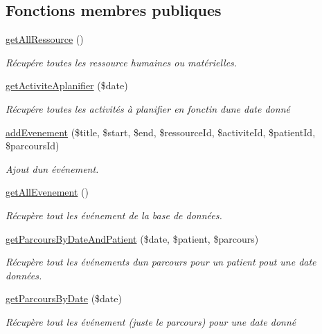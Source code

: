 \subsection*{Fonctions membres publiques}
\begin{DoxyCompactItemize}
\item 
\hyperlink{class_m___planning_a058d0ecc4af6cfeadea6908cede9dcbb}{get\+All\+Ressource} ()
\begin{DoxyCompactList}\small\item\em Récupére toutes les ressource humaines ou matérielles. \end{DoxyCompactList}\item 
\hyperlink{class_m___planning_ac8e09307ac103e0f2b8bbfa828e7f723}{get\+Activite\+Aplanifier} (\$date)
\begin{DoxyCompactList}\small\item\em Récupére toutes les activités à planifier en fonctin d\textquotesingle{}une date donné \end{DoxyCompactList}\item 
\hyperlink{class_m___planning_abafbb98badd73ecbd019d9a4c15cd477}{add\+Evenement} (\$title, \$start, \$end, \$ressource\+Id, \$activite\+Id, \$patient\+Id, \$parcours\+Id)
\begin{DoxyCompactList}\small\item\em Ajout d\textquotesingle{}un événement. \end{DoxyCompactList}\item 
\hyperlink{class_m___planning_adaed7f7dad15559184206d3705a9f78a}{get\+All\+Evenement} ()
\begin{DoxyCompactList}\small\item\em Récupère tout les événement de la base de données. \end{DoxyCompactList}\item 
\hyperlink{class_m___planning_a6a9b1fa1202b0171f8ceb3e69717e2bb}{get\+Parcours\+By\+Date\+And\+Patient} (\$date, \$patient, \$parcours)
\begin{DoxyCompactList}\small\item\em Récupère tout les événements d\textquotesingle{}un parcours pour un patient pout une date données. \end{DoxyCompactList}\item 
\hyperlink{class_m___planning_ac00607356a988cc322ac3353fc8f5134}{get\+Parcours\+By\+Date} (\$date)
\begin{DoxyCompactList}\small\item\em Récupère tout les événement (juste le parcours) pour une date donné \end{DoxyCompactList}\item 

\end{DoxyCompactItemize}
